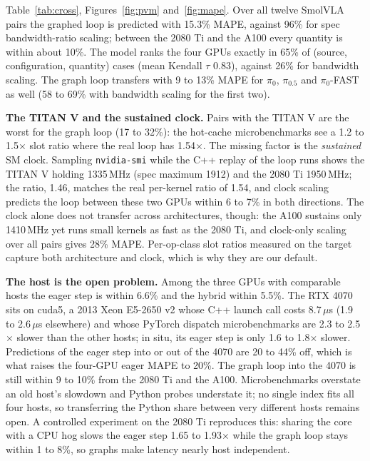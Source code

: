 \documentclass[10pt,twocolumn]{article}
\begin{document}
Table~\ref{tab:cross}, Figures~\ref{fig:pvm} and~\ref{fig:mape}. Over all twelve SmolVLA pairs
the graphed loop is predicted with 15.3\% MAPE, against 96\% for spec bandwidth-ratio scaling;
between the 2080 Ti and the A100 every quantity is within about 10\%. The model ranks the four GPUs
exactly in 65\% of (source, configuration, quantity) cases (mean Kendall $\tau$ 0.83), against
26\% for bandwidth scaling. The graph loop transfers with 9 to 13\% MAPE for $\pi_0$,
$\pi_{0.5}$ and $\pi_0$-FAST as well (58 to 69\% with bandwidth scaling for the first two).

\textbf{The TITAN V and the sustained clock.} Pairs with the TITAN V are the worst for the graph
loop (17 to 32\%): the hot-cache microbenchmarks see a 1.2 to 1.5$\times$ slot ratio where the
real loop has 1.54$\times$. The missing factor is the \emph{sustained} SM clock. Sampling
\texttt{nvidia-smi} while the C++ replay of the loop runs shows the TITAN V holding 1335\,MHz
(spec maximum 1912) and the 2080 Ti 1950\,MHz; the ratio, 1.46, matches the real per-kernel
ratio of 1.54, and clock scaling predicts the loop between these two GPUs within 6 to 7\% in
both directions. The clock alone does not transfer across architectures, though: the A100
sustains only 1410\,MHz yet runs small kernels as fast as the 2080 Ti, and clock-only scaling
over all pairs gives 28\% MAPE. Per-op-class slot ratios measured on the target capture both
architecture and clock, which is why they are our default.

\textbf{The host is the open problem.} Among the three GPUs with comparable hosts the eager
step is within 6.6\% and the hybrid within 5.5\%. The RTX 4070 sits on cuda5, a 2013 Xeon
E5-2650 v2 whose C++ launch call costs 8.7\,$\mu$s (1.9 to 2.6\,$\mu$s elsewhere) and whose
PyTorch dispatch microbenchmarks are 2.3 to 2.5$\times$ slower than the other hosts; in situ,
its eager step is only 1.6 to 1.8$\times$ slower. Predictions of the eager step into or out of
the 4070 are 20 to 44\% off, which is what raises the four-GPU eager MAPE to 20\%. The graph
loop into the 4070 is still within 9 to 10\% from the 2080 Ti and the A100. Microbenchmarks overstate an old host's slowdown
and Python probes understate it; no single index fits all four hosts, so transferring the Python
share between very different hosts remains open. A controlled experiment on the 2080 Ti
reproduces this: sharing the core with a CPU hog slows the eager step 1.65 to 1.93$\times$
while the graph loop stays within 1 to 8\%, so graphs make latency nearly host independent.
\end{document}
